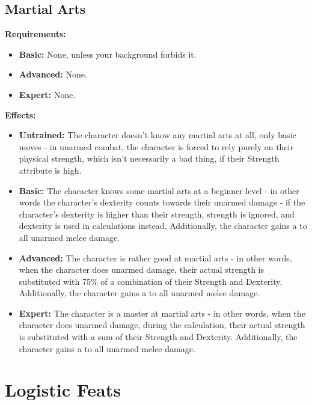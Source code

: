 \documentclass[openany,10pt,a4paper]{book}
\begin{document}
\subsection{Martial Arts}
\begin{table}[!ht]
\centering
{}
\end{table}
\textbf{Requirements:}
\begin{itemize}
	\item \textbf{Basic:} None, unless your background forbids it.
	\item \textbf{Advanced:} None.
	\item \textbf{Expert:} None.
\end{itemize}
\textbf{Effects:}
\begin{itemize}
	\item \textbf{Untrained:} The character doesn't know any martial arts at all, only basic moves  - in unarmed combat, the character is forced to rely purely on their physical strength, which isn't necessarily a bad thing, if their Strength attribute is high.
	\item \textbf{Basic:} The character knows some martial arts at a beginner level - in other words the character's dexterity counts towards their unarmed damage - if the character's dexterity is higher than their strength, strength is ignored, and dexterity is used in calculations instead. Additionally, the character gains a  to all unarmed melee damage.
	\item \textbf{Advanced:} The character is rather good at martial arts - in other words, when the character does unarmed damage, their actual strength is substituted with 75\% of a combination of their Strength and Dexterity. Additionally, the character gains a  to all unarmed melee damage.
	\item \textbf{Expert:} The character is a master at martial arts - in other words, when the character does unarmed damage, during the calculation, their actual strength is substituted with a sum of their Strength and Dexterity. Additionally, the character gains a  to all unarmed melee damage.
\end{itemize}\newpage
\section{Logistic Feats}
\end{document}
